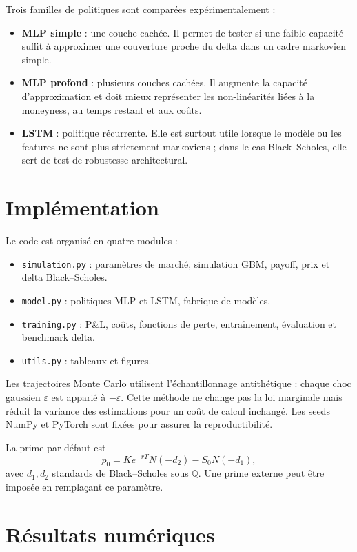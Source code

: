 \documentclass[11pt,a4paper]{article}
\begin{document}
Trois familles de politiques sont comparées expérimentalement :
\begin{itemize}
\item \textbf{MLP simple} : une couche cachée. Il permet de tester si une faible
capacité suffit à approximer une couverture proche du delta dans un cadre
markovien simple.
\item \textbf{MLP profond} : plusieurs couches cachées. Il augmente la capacité
d'approximation et doit mieux représenter les non-linéarités liées à la
moneyness, au temps restant et aux coûts.
\item \textbf{LSTM} : politique récurrente. Elle est surtout utile lorsque le
modèle ou les features ne sont plus strictement markoviens ; dans le cas
Black--Scholes, elle sert de test de robustesse architectural.
\end{itemize}

\section{Implémentation}

Le code est organisé en quatre modules :
\begin{itemize}
\item \texttt{simulation.py} : paramètres de marché, simulation GBM,
payoff, prix et delta Black--Scholes.
\item \texttt{model.py} : politiques MLP et LSTM, fabrique de modèles.
\item \texttt{training.py} : P\&L, coûts, fonctions de perte, entraînement,
évaluation et benchmark delta.
\item \texttt{utils.py} : tableaux et figures.
\end{itemize}

Les trajectoires Monte Carlo utilisent l'échantillonnage antithétique :
chaque choc gaussien $\varepsilon$ est apparié à $-\varepsilon$. Cette méthode
ne change pas la loi marginale mais réduit la variance des estimations pour un
coût de calcul inchangé. Les seeds NumPy et PyTorch sont fixées pour assurer la
reproductibilité.

La prime par défaut est
\[
p_0=K e^{-rT}N(-d_2)-S_0N(-d_1),
\]
avec $d_1,d_2$ standards de Black--Scholes sous $\mathbb{Q}$. Une prime
externe peut être imposée en remplaçant ce paramètre.

\section{Résultats numériques}
\end{document}
